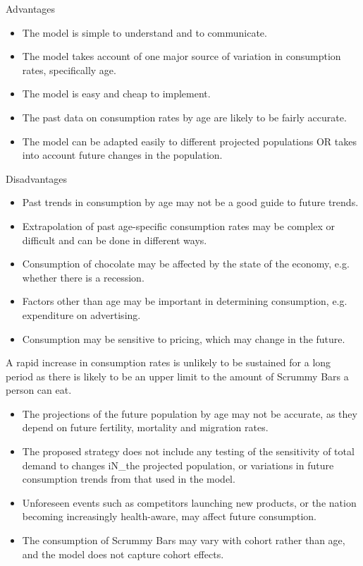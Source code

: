 \documentclass[a4paper,12pt]{article}
\begin{document}
\newpage
Advantages
\begin{itemize}
\item The model is simple to understand and to communicate.
\item The model takes account of one major source of variation in consumption
rates, specifically age.
\item The model is easy and cheap to implement.
\item The past data on consumption rates by age are likely to be fairly accurate.
\item The model can be adapted easily to different projected populations OR takes
into account future changes in the population.
\end{itemize}
Disadvantages
\begin{itemize}
\item Past trends in consumption by age may not be a good guide to future trends.
\item Extrapolation of past age-specific consumption rates may be complex or
difficult and can be done in different ways.
\item Consumption of chocolate may be affected by the state of the economy,
e.g. whether there is a recession.
\item Factors other than age may be important in determining consumption,
e.g. expenditure on advertising.
\item Consumption may be sensitive to pricing, which may change in the future.
\end{itemize}
A rapid increase in consumption rates is unlikely to be sustained
for a long period as there is likely to be an upper limit to
the amount of Scrummy Bars a person can eat.
\begin{itemize}
\item The projections of the future population by age may not be accurate, as
they depend on future fertility, mortality and migration rates.
\item The proposed strategy does not include any testing of the sensitivity of total demand to changes iN_the projected population, or variations in future consumption trends from that used in the model.
\item Unforeseen events such as competitors launching new products, or the nation becoming increasingly health-aware, may affect future consumption.
\item The consumption of Scrummy Bars may vary with cohort rather than age, and
the model does not capture cohort effects.
\end{itemize}
\end{document}
